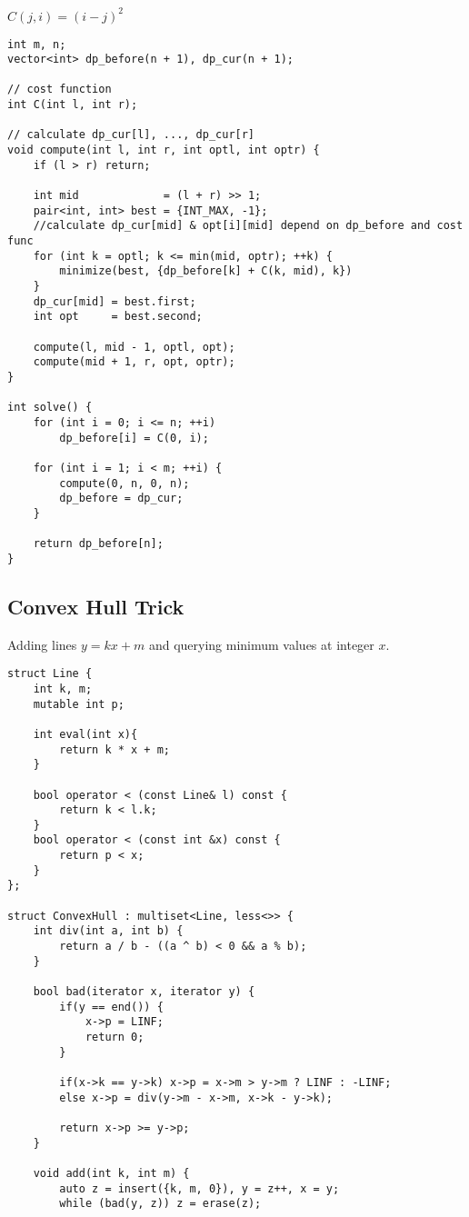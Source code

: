 \documentclass[11pt,a4paper]{article}
\begin{document}
\begin{multicols*}{2}
$C(j, i) = (i - j)^2$
\begin{lstlisting}
int m, n;
vector<int> dp_before(n + 1), dp_cur(n + 1);

// cost function
int C(int l, int r);

// calculate dp_cur[l], ..., dp_cur[r]
void compute(int l, int r, int optl, int optr) {
    if (l > r) return;

    int mid             = (l + r) >> 1;
    pair<int, int> best = {INT_MAX, -1};
    //calculate dp_cur[mid] & opt[i][mid] depend on dp_before and cost func
    for (int k = optl; k <= min(mid, optr); ++k) {
        minimize(best, {dp_before[k] + C(k, mid), k})
    }
    dp_cur[mid] = best.first;
    int opt     = best.second;

    compute(l, mid - 1, optl, opt);
    compute(mid + 1, r, opt, optr);
}

int solve() {
    for (int i = 0; i <= n; ++i)
        dp_before[i] = C(0, i);

    for (int i = 1; i < m; ++i) {
        compute(0, n, 0, n);
        dp_before = dp_cur;
    }

    return dp_before[n];
}
\end{lstlisting}

\subsection{Convex Hull Trick}
Adding lines $y = kx + m$ and querying minimum values at integer $x$.
\begin{lstlisting}
struct Line {
    int k, m;
    mutable int p;
    
    int eval(int x){
    	return k * x + m;
    }
    
    bool operator < (const Line& l) const {
        return k < l.k;
    }
    bool operator < (const int &x) const {
        return p < x;
    }
};
 
struct ConvexHull : multiset<Line, less<>> {
    int div(int a, int b) {
        return a / b - ((a ^ b) < 0 && a % b);
    }

    bool bad(iterator x, iterator y) {
        if(y == end()) { 
            x->p = LINF;
            return 0; 
        }

        if(x->k == y->k) x->p = x->m > y->m ? LINF : -LINF;
        else x->p = div(y->m - x->m, x->k - y->k);

        return x->p >= y->p;
    }

    void add(int k, int m) {
        auto z = insert({k, m, 0}), y = z++, x = y;
        while (bad(y, z)) z = erase(z);


\end{lstlisting}
\end{multicols*}
\end{document}
